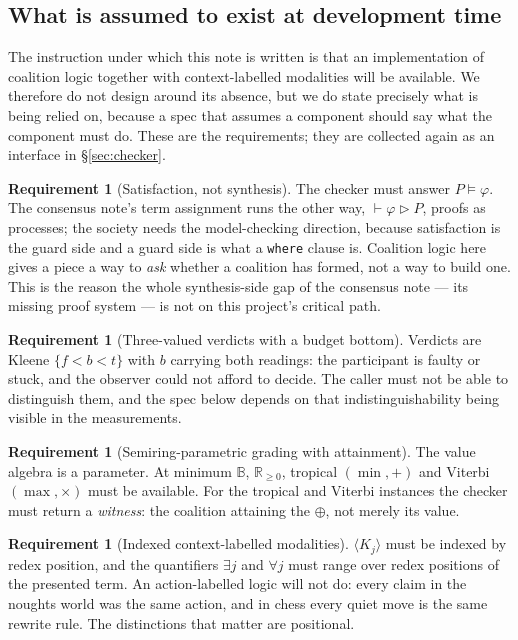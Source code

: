 \documentclass[11pt,a4paper]{article}
\theoremstyle{plain}
\theoremstyle{definition}
\newtheorem{requirement}[theorem]{Requirement}
\theoremstyle{remark}
\newcommand{\Rnn}{\mathbb{R}_{\geq 0}}
\newcommand{\Kmod}[1]{\langle K_{#1}\rangle}
\begin{document}
\subsection{What is assumed to exist at development time}
\label{sec:assumed}

The instruction under which this note is written is that an implementation of
coalition logic together with context-labelled modalities will be available. We
therefore do not design around its absence, but we do state precisely what is
being relied on, because a spec that assumes a component should say what the
component must do. These are the requirements; they are collected again as an
interface in \S\ref{sec:checker}.

\begin{requirement}[Satisfaction, not synthesis]
\label{req:direction}
The checker must answer $P \models \varphi$. The consensus note's term
assignment runs the other way, $\vdash \varphi \rhd P$, proofs as processes; the
society needs the model-checking direction, because satisfaction is the guard
side and a guard side is what a \texttt{where} clause is. Coalition logic here
gives a piece a way to \emph{ask} whether a coalition has formed, not a way to
build one. This is the reason the whole synthesis-side gap of the consensus note
--- its missing proof system --- is not on this project's critical path.
\end{requirement}

\begin{requirement}[Three-valued verdicts with a budget bottom]
Verdicts are Kleene $\{f < b < t\}$ with $b$ carrying both readings: the
participant is faulty or stuck, and the observer could not afford to decide.
The caller must not be able to distinguish them, and the spec below depends on
that indistinguishability being visible in the measurements.
\end{requirement}

\begin{requirement}[Semiring-parametric grading with attainment]
The value algebra is a parameter. At minimum $\mathbb{B}$, $\Rnn$, tropical
$(\min,+)$ and Viterbi $(\max,\times)$ must be available. For the tropical and
Viterbi instances the checker must return a \emph{witness}: the coalition
attaining the $\oplus$, not merely its value.
\end{requirement}

\begin{requirement}[Indexed context-labelled modalities]
$\Kmod{j}$ must be indexed by redex position, and the quantifiers $\exists j$
and $\forall j$ must range over redex positions of the presented term. An
action-labelled logic will not do: every claim in the noughts world was the same
action, and in chess every quiet move is the same rewrite rule. The distinctions
that matter are positional.
\end{requirement}
\end{document}
